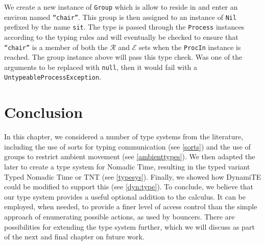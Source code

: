 \noindent We create a new instance of \texttt{Group} which is allow to
reside in and enter an environ named \texttt{``chair''}.  This group
is then assigned to an instance of \texttt{Nil} prefixed by the name
\texttt{sit}.  The type is passed through the \texttt{Process}
instances according to the typing rules and will eventually be checked
to ensure that \texttt{``chair''} is a member of both the
$\mathscr{R}$ and $\mathscr{E}$ sets when the \texttt{ProcIn} instance
is reached.  The group instance above will pass this type check.  Was
one of the arguments to be replaced with \texttt{null}, then it would
fail with a \texttt{UntypeableProcessException}.

\section{Conclusion}

In this chapter, we considered a number of type systems from the
literature, including the use of sorts for typing communication (see
\ref{sorts}) and the use of groups to restrict ambient movement (see
\ref{ambienttypes}).  We then adapted the later to create a type
system for Nomadic Time, resulting in the typed variant Typed Nomadic
Time or TNT (see \ref{typesys}). Finally, we showed how DynamiTE could
be modified to support this (see \ref{dyn:type}).  To conclude, we
believe that our type system provides a useful optional addition to
the calculus.  It can be employed, when needed, to provide a finer
level of access control than the simple approach of enumerating
possible actions, as used by bouncers.  There are possibilities for
extending the type system further, which we will discuss as part of
the next and final chapter on future work.
